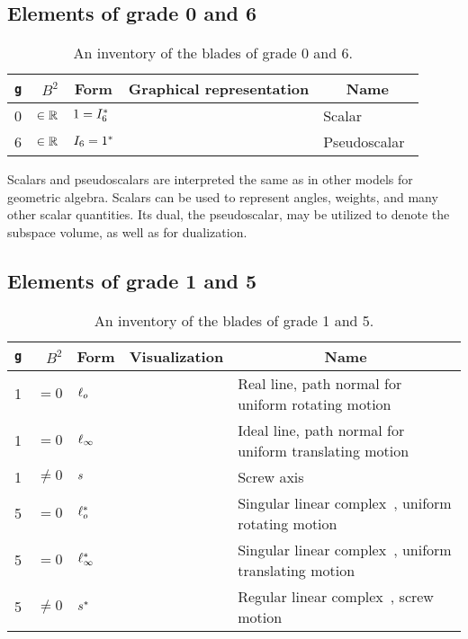 
\subsection{Elements of grade 0 and 6}
\begin{table}
  \caption{An inventory of the blades of grade 0 and 6.}
  \label{tab:inv0}
  \begin{tabular}{|c|r|l|c|l|}
    \hline
    \multicolumn{1}{|c|}{\texttt{g}} & $B^2$ & \multicolumn{1}{|c|}{Form} & \multicolumn{1}{|c|}{Graphical representation} & \multicolumn{1}{|c|}{Name} \\ \hline
    \hline
    0 & $\in \mathbb{R}$ & $1 = I_6^\ast$ & & Scalar~\cite{TheBook} \\ \hline
    6 & $\in \mathbb{R}$ & $I_6 = 1^\ast$ & & Pseudoscalar~\cite{TheBook} \\ \hline
  \end{tabular}
\end{table}

Scalars and pseudoscalars are interpreted the same as in other models for geometric algebra.  Scalars can be used to represent angles, weights, and many other scalar quantities.  Its dual, the pseudoscalar, may be utilized to denote the subspace volume, as well as for dualization.


\subsection{Elements of grade 1 and 5}
\begin{table}
  \caption{An inventory of the blades of grade 1 and 5.  
    }
  \label{tab:inv1}
  \begin{tabular}{|c|r|p{2.7cm}|p{2cm}|p{5cm}|}
    \hline
    \multicolumn{1}{|c|}{\texttt{g}} & $B^2$ & \multicolumn{1}{|c|}{Form} & \multicolumn{1}{|c|}{Visualization} & \multicolumn{1}{|c|}{Name} \\ \hline
    \hline
    1 & $= 0$ & $\ell_o$ & & Real line, path normal for uniform rotating motion\\ \hline
    1 & $= 0$ & $\ell_\infty$ & & Ideal line, path normal for uniform translating motion\\ \hline
    1 & $\not= 0$ & $s$ & & Screw axis \\ \hline
    5 & $= 0$ & $\ell_o^\ast$ & & Singular linear complex~\cite{Pottmann}, uniform rotating motion \\ \hline
    5 & $= 0$ & $\ell_\infty^\ast$ & & Singular linear complex~\cite{Pottmann}, uniform translating motion \\ \hline
    5 & $\not= 0$ & $s^\ast$ & & Regular linear complex~\cite{Pottmann}, screw motion \\ \hline
  \end{tabular}
\end{table}

